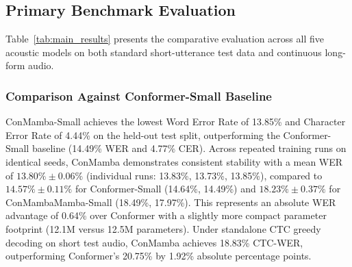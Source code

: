 \documentclass[journal]{IEEEtran}
\begin{document}
\begin{table}[!t]
\centering
\caption{Comprehensive Benchmark Evaluation on the Curated EJUST Egyptian Arabic Dataset Across Short-Form and Continuous Long-Form Test Splits. Real-Time Factor (RTF) Measured on a Single NVIDIA Tesla T4 GPU.}
\label{tab:main_results}
\end{table}

\subsection{Primary Benchmark Evaluation}
\label{sec:main_eval}
Table~\ref{tab:main_results} presents the comparative evaluation across all five acoustic models on both standard short-utterance test data and continuous long-form audio.

\subsubsection{Comparison Against Conformer-Small Baseline}
ConMamba-Small achieves the lowest Word Error Rate of 13.85\% and Character Error Rate of 4.44\% on the held-out test split, outperforming the Conformer-Small baseline (14.49\% WER and 4.77\% CER). Across repeated training runs on identical seeds, ConMamba demonstrates consistent stability with a mean WER of $13.80\% \pm 0.06\%$ (individual runs: 13.83\%, 13.73\%, 13.85\%), compared to $14.57\% \pm 0.11\%$ for Conformer-Small (14.64\%, 14.49\%) and $18.23\% \pm 0.37\%$ for ConMambaMamba-Small (18.49\%, 17.97\%). This represents an absolute WER advantage of 0.64\% over Conformer with a slightly more compact parameter footprint (12.1M versus 12.5M parameters). Under standalone CTC greedy decoding on short test audio, ConMamba achieves 18.83\% CTC-WER, outperforming Conformer's 20.75\% by 1.92\% absolute percentage points.
\end{document}
